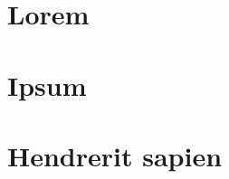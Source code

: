 \usepackage{lipsum}




\coverpage{\TITLE}{\SUBTITLE}{\AUTHOR}{\DATE}{\SUBJECT}
\newpage
\tableofcontents

\newpage
\chapter{Lorem} \label{ch:lorem}

\newpage
\chapter{Ipsum}\label{ch:ipsum}


\newpage
\chapter{Hendrerit sapien} \label{ch:hendrerit}

\newpage


